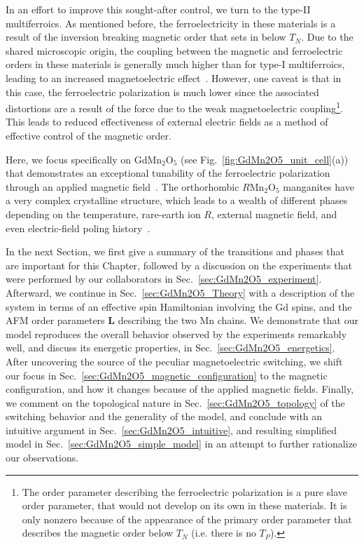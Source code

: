 In an effort to improve this sought-after control, we turn to the type-II multiferroics.
As mentioned before, the ferroelectricity in these materials is a result of the inversion breaking magnetic order that sets in below $T_N$.
Due to the shared microscopic origin, the coupling between the magnetic and ferroelectric orders in these materials is generally much higher than for type-I multiferroics, leading to an increased magnetoelectric effect~\cite{Oh2014,Radaelli08Y}.
However, one caveat is that in this case, the ferroelectric polarization is much lower since the associated distortions are a result of the force due to the weak magnetoelectric coupling\footnote{The order parameter describing the ferroelectric polarization is a pure slave order parameter, that would not develop on its own in these materials. It is only nonzero because of the appearance of the primary order parameter that describes the magnetic order below $T_N$ (i.e. there is no $T_{P}$).}.
This leads to reduced effectiveness of external electric fields as a method of effective control of the magnetic order.  

Here, we focus specifically on GdMn$_2$O$_5$ (see Fig.~\ref{fig:GdMn2O5_unit_cell}(a)) that demonstrates an exceptional tunability of the ferroelectric polarization through an applied magnetic field~\cite{Khomskii2009,Lee13}.
The orthorhombic $R$Mn$_2$O$_5$ manganites have a very complex crystalline structure, which leads to a wealth of different phases depending on the temperature, rare-earth ion $R$, external magnetic field, and even electric-field poling history~\cite{Chapon04, Chapon06, Blake05, Radaelli09,Radaelli08, Zheng2019}.

In the next Section, we first give a summary of the transitions and phases that are important for this Chapter, followed by a discussion on the experiments that were performed by our collaborators in Sec.~\ref{sec:GdMn2O5_experiment}.
Afterward, we continue in Sec.~\ref{sec:GdMn2O5_Theory} with a description of the system in terms of an effective spin Hamiltonian involving the Gd spins, and the \gls{AFM} order parameters $\bm L$ describing the two Mn chains.
We demonstrate that our model reproduces the overall behavior observed by the experiments remarkably well, and discuss its energetic properties, in Sec.~\ref{sec:GdMn2O5_energetics}.
After uncovering the source of the peculiar magnetoelectric switching, we shift our focus in Sec.~\ref{sec:GdMn2O5_magnetic_configuration} to the magnetic configuration, and how it changes because of the applied magnetic fields.
Finally, we comment on the topological nature in Sec.~\ref{sec:GdMn2O5_topology} of the switching behavior and the generality of the model, and conclude with an intuitive argument in Sec.~\ref{sec:GdMn2O5_intuitive}, and resulting simplified model in Sec.~\ref{sec:GdMn2O5_simple_model} in an attempt to further rationalize our observations. 

